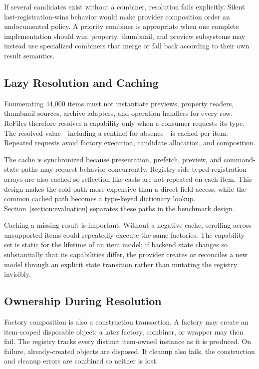\documentclass[10pt,a4paper,twoside]{article}
\begin{document}
If several candidates exist without a combiner, resolution fails explicitly. Silent last-registration-wins
behavior would make provider composition order an undocumented policy. A priority combiner is appropriate when
one complete implementation should win; property, thumbnail, and preview subsystems may instead use specialized
combiners that merge or fall back according to their own result semantics.

\subsection{Lazy Resolution and Caching}

Enumerating 44,000 items must not instantiate previews, property readers, thumbnail sources, archive adapters,
and operation handlers for every row. ReFiles therefore resolves a capability only when a consumer requests its
type. The resolved value---including a sentinel for absence---is cached per item. Repeated requests avoid factory
execution, candidate allocation, and composition.

The cache is synchronized because presentation, prefetch, preview, and command-state paths may request behavior
concurrently. Registry-side typed registration arrays are also cached so reflection-like casts are not repeated
on each item. This design makes the cold path more expensive than a direct field access, while the common cached
path becomes a type-keyed dictionary lookup. Section~\ref{section:evaluation} separates these paths in the
benchmark design.

Caching a missing result is important. Without a negative cache, scrolling across unsupported items could
repeatedly execute the same factories. The capability set is static for the lifetime of an item model; if backend
state changes so substantially that its capabilities differ, the provider creates or reconciles a new model
through an explicit state transition rather than mutating the registry invisibly.

\subsection{Ownership During Resolution}

Factory composition is also a construction transaction. A factory may create an item-scoped disposable object;
a later factory, combiner, or wrapper may then fail. The registry tracks every distinct item-owned instance as it
is produced. On failure, already-created objects are disposed. If cleanup also fails, the construction and
cleanup errors are combined so neither is lost.
\end{document}
